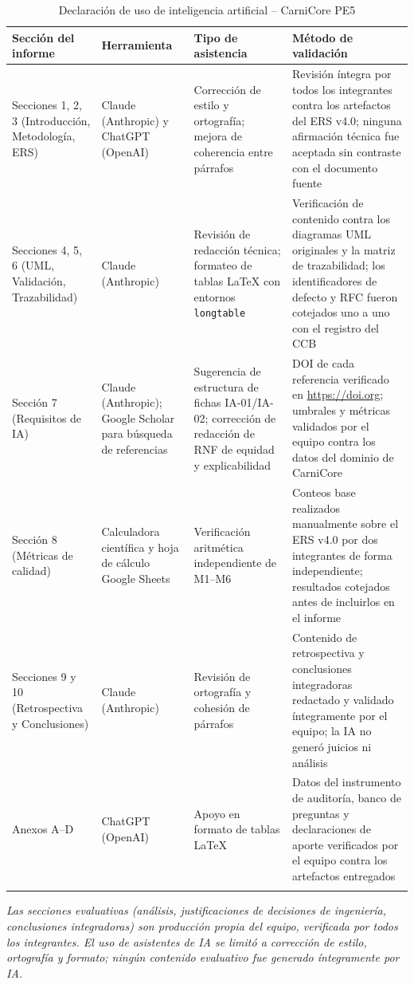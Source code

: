 \documentclass[11pt,a4paper]{article}
\begin{document}
\begin{longtable}{|p{3cm}|p{4cm}|p{3cm}|p{3.5cm}|}
\hline
\textbf{Sección del informe} & \textbf{Herramienta} & \textbf{Tipo de asistencia} & \textbf{Método de validación} \\
\hline
Secciones 1, 2, 3 (Introducción, Metodología, ERS) & Claude (Anthropic) y ChatGPT (OpenAI) & Corrección de estilo y ortografía; mejora de coherencia entre párrafos & Revisión íntegra por todos los integrantes contra los artefactos del ERS v4.0; ninguna afirmación técnica fue aceptada sin contraste con el documento fuente \\
\hline
Secciones 4, 5, 6 (UML, Validación, Trazabilidad) & Claude (Anthropic) & Revisión de redacción técnica; formateo de tablas LaTeX con entornos \texttt{longtable} & Verificación de contenido contra los diagramas UML originales y la matriz de trazabilidad; los identificadores de defecto y RFC fueron cotejados uno a uno con el registro del CCB \\
\hline
Sección 7 (Requisitos de IA) & Claude (Anthropic); Google Scholar para búsqueda de referencias & Sugerencia de estructura de fichas IA-01/IA-02; corrección de redacción de RNF de equidad y explicabilidad & DOI de cada referencia verificado en \url{https://doi.org}; umbrales y métricas validados por el equipo contra los datos del dominio de CarniCore \\
\hline
Sección 8 (Métricas de calidad) & Calculadora científica y hoja de cálculo Google Sheets & Verificación aritmética independiente de M1--M6 & Conteos base realizados manualmente sobre el ERS v4.0 por dos integrantes de forma independiente; resultados cotejados antes de incluirlos en el informe \\
\hline
Secciones 9 y 10 (Retrospectiva y Conclusiones) & Claude (Anthropic) & Revisión de ortografía y cohesión de párrafos & Contenido de retrospectiva y conclusiones integradoras redactado y validado íntegramente por el equipo; la IA no generó juicios ni análisis \\
\hline
Anexos A--D & ChatGPT (OpenAI) & Apoyo en formato de tablas LaTeX & Datos del instrumento de auditoría, banco de preguntas y declaraciones de aporte verificados por el equipo contra los artefactos entregados \\
\hline
\caption{Declaración de uso de inteligencia artificial -- CarniCore PE5}
\end{longtable}

\textit{Las secciones evaluativas (análisis, justificaciones de decisiones de ingeniería, conclusiones integradoras) son producción propia del equipo, verificada por todos los integrantes. El uso de asistentes de IA se limitó a corrección de estilo, ortografía y formato; ningún contenido evaluativo fue generado íntegramente por IA.}
\end{document}
